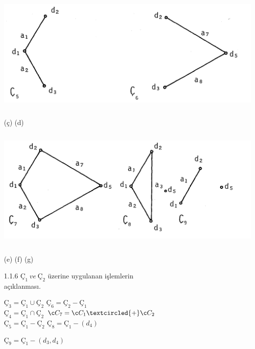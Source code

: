 \documentclass[11pt]{amsbook}
\begin{document}

\includegraphics[width=\textwidth, height=6cm]{images/ceyhun-008-fig01}
    
\hspace{3cm} (ç) \hspace{9cm} (d)

\includegraphics[width=\textwidth, height=6cm]{images/ceyhun-008-fig02}

\hspace{3cm} (e) \hspace{6cm} (f) \hspace{2cm} (g)

\figurename{ 1.1.6} $Ç_{1}\ ve\ Ç_{2}$ üzerine uygulanan işlemlerin\\
açıklanması. 

\hspace{3cm} $Ç_{3}=Ç_{1}\cup Ç_{2}$ \hspace{5cm} $Ç_{6}=Ç_{2}-Ç_{1}$\\

\hspace{3cm} $Ç_{4}=Ç_{1}\cap Ç_{2}$ \hspace{5cm} $Ç_{7}=Ç_{1}\textcircled{+}Ç_{2}$\\

\hspace{3cm} $Ç_{5}=Ç_{1}-Ç_{2}$ \hspace{5cm} $Ç_{8}=Ç_{1}-(d_{4})$\\


\begin{center}
    
    $Ç_{9}=Ç_{1}-(d_{3},d_{4})$
    
\end{center}
\end{document}
